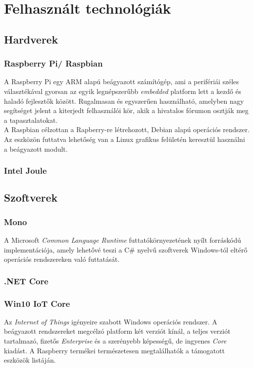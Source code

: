 \chapter{Felhasznált technológiák}
\section{Hardverek}
\subsection{Raspberry Pi/ Raspbian}

A Raspberry Pi egy ARM alapú beágyazott számítógép, ami a perifériái széles választékával gyorsan az egyik legnépszerűbb \textit{embedded} platform lett a kezdő és haladó fejlesztők között. Rugalmasan és egyszerűen használható, amelyben nagy segítséget jelent a kiterjedt felhasználói kör, akik a hivatalos fórumon osztják meg a tapasztalatokat. \\
A Raspbian célzottan a Rapberry-re létrehozott, Debian alapú operációs rendszer. Az eszközön futtatva lehetőség van a Linux grafikus felületén keresztül használni a beágyazott modult.

\subsection{Intel Joule}

\section{Szoftverek}
\subsection{Mono}

A Microsoft \emph{Common Language Runtime} futtatókörnyezetének nyílt forráskódú implementációja, amely lehetővé teszi a C\# nyelvű szoftverek Windows-tól eltérő operációs rendszereken való futtatását.

\subsection{.NET Core}

\subsection{Win10 IoT Core}

Az \emph{Internet of Things} igényeire szabott Windows operációs rendszer. A beágyazott rendszereket megcélzó platform két verziót kínál, a teljes verziót tartalmazó, fizetős \emph{Enterprise} és a szerényebb képességű, de ingyenes \emph{Core} kiadást. A Raspberry termékei természetesen megtalálhatók a támogatott eszközök listáján.

